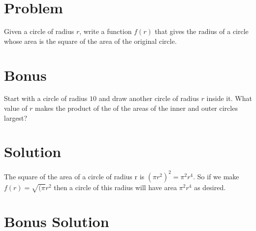 \documentclass[11pt,a4paper]{report}
\theoremstyle{plain}
\theoremstyle{definition}
\theoremstyle{remark}
\begin{document}
\section*{Problem}
Given a circle of radius $r$, write a function $f(r)$ that gives the radius of a circle whose area is the square of the area of the original circle.

\section*{Bonus}
Start with a circle of radius $10$ and draw another circle of radius $r$ inside it.  What value of $r$ makes the product of the of the areas of the inner and outer circles largest?

\newpage
\section*{Solution}
The square of the area of a circle of radius r is $( \pi r^2)^2 = \pi^2r^4$.   So if we make $f(r) = \sqrt{(\pi}r^2$ then a circle of this radius will have area $\pi^2r^4$ as desired.

\section*{Bonus Solution}
 
 
\end{document}
